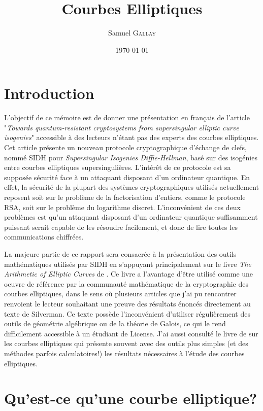 \documentclass{article}
\title{Courbes Elliptiques}
\author{Samuel \textsc{Gallay}}
\date{\today}
\theoremstyle{plain}%
\theoremstyle{definition}%
\begin{document}
\maketitle

\tableofcontents

\newpage

\section{Introduction}


L'objectif de ce mémoire est de donner une présentation en français de l'article \cite{DeFeo} "\emph{Towards quantum-resistant cryptosystems from supersingular elliptic curve isogenies}" accessible à des lecteurs n'étant pas des experts des courbes elliptiques.
Cet article présente un nouveau protocole cryptographique d'échange de clefs, nommé SIDH pour \emph{Supersingular Isogenies Diffie-Hellman}, basé sur des isogénies entre courbes elliptiques supersingulières. 
L'intérêt de ce protocole est sa supposée sécurité face à un attaquant disposant d'un ordinateur quantique. 
En effet, la sécurité de la plupart des systèmes cryptographiques utilisés actuellement reposent soit sur le problème de la factorisation d'entiers, comme le protocole RSA, soit sur le problème du logarithme discret. 
L'inconvénient de ces deux problèmes est qu'un attaquant disposant d'un ordinateur quantique suffisamment puissant serait capable de les résoudre facilement, et donc de lire toutes les communications chiffrées.

La majeure partie de ce rapport sera consacrée à la présentation des outils mathématiques utilisés par SIDH en s'appuyant principalement sur le livre \emph{The Arithmetic of Elliptic Curves} de \cite{Silverman}. Ce livre a l'avantage d'être utilisé comme une oeuvre de référence par la communauté mathématique de la cryptographie des courbes elliptiques, dans le sens où plusieurs articles que j'ai pu rencontrer renvoient le lecteur souhaitant une preuve des résultats énoncés directement au texte de Silverman. Ce texte possède l'inconvénient d'utiliser régulièrement des outils de géométrie algébrique ou de la théorie de Galois, ce qui le rend difficilement accessible à un étudiant de License. J'ai aussi consulté le livre de \cite{Washington} sur les courbes elliptiques qui présente souvent avec des outils plus simples (et des méthodes parfois calculatoires!) les résultats nécessaires à l'étude des courbes elliptiques. 

\section{Qu'est-ce qu'une courbe elliptique?}
\end{document}
